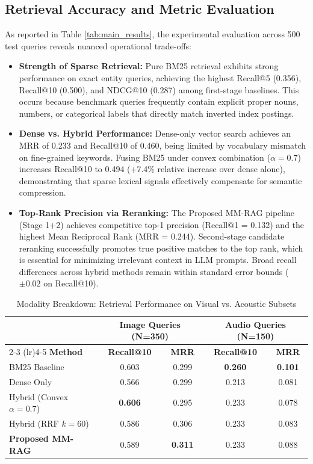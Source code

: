 \documentclass[conference]{IEEEtran}
\begin{document}
\subsection{Retrieval Accuracy and Metric Evaluation}
As reported in Table \ref{tab:main_results}, the experimental evaluation across 500 test queries reveals nuanced operational trade-offs:
\begin{itemize}
    \item \textbf{Strength of Sparse Retrieval:} Pure BM25 retrieval exhibits strong performance on exact entity queries, achieving the highest Recall@5 (0.356), Recall@10 (0.500), and NDCG@10 (0.287) among first-stage baselines. This occurs because benchmark queries frequently contain explicit proper nouns, numbers, or categorical labels that directly match inverted index postings.
    \item \textbf{Dense vs. Hybrid Performance:} Dense-only vector search achieves an MRR of 0.233 and Recall@10 of 0.460, being limited by vocabulary mismatch on fine-grained keywords. Fusing BM25 under convex combination ($\alpha=0.7$) increases Recall@10 to 0.494 (+7.4\% relative increase over dense alone), demonstrating that sparse lexical signals effectively compensate for semantic compression.
    \item \textbf{Top-Rank Precision via Reranking:} The Proposed MM-RAG pipeline (Stage 1+2) achieves competitive top-1 precision (Recall@1 = 0.132) and the highest Mean Reciprocal Rank (MRR = 0.244). Second-stage candidate reranking successfully promotes true positive matches to the top rank, which is essential for minimizing irrelevant context in LLM prompts. Broad recall differences across hybrid methods remain within standard error bounds ($\pm 0.02$ on Recall@10).
\end{itemize}

\begin{table}[h]
\centering
\caption{Modality Breakdown: Retrieval Performance on Visual vs. Acoustic Subsets}
\label{tab:modality_breakdown}
\begin{tabular}{@{}lcccc@{}}
\toprule
 & \multicolumn{2}{c}{\textbf{Image Queries (N=350)}} & \multicolumn{2}{c}{\textbf{Audio Queries (N=150)}} \\
\cmidrule(lr){2-3} \cmidrule(lr){4-5}
\textbf{Method} & \textbf{Recall@10} & \textbf{MRR} & \textbf{Recall@10} & \textbf{MRR} \\ \midrule
BM25 Baseline & 0.603 & 0.299 & \textbf{0.260} & \textbf{0.101} \\
Dense Only & 0.566 & 0.299 & 0.213 & 0.081 \\
Hybrid (Convex $\alpha=0.7$) & \textbf{0.606} & 0.295 & 0.233 & 0.078 \\
Hybrid (RRF $k=60$) & 0.586 & 0.306 & 0.233 & 0.083 \\
\textbf{Proposed MM-RAG} & 0.589 & \textbf{0.311} & 0.233 & 0.088 \\ \bottomrule
\end{tabular}
\end{table}
\end{document}

